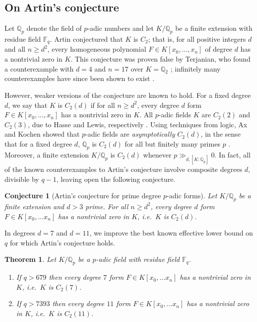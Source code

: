\documentclass{amsart}
\newcommand{\Q}{\mathbb{Q}}
\newcommand{\F}{\mathbb{F}}
\newtheorem{theoremAlph}{Theorem}
\newtheorem*{conjecture*}{Conjecture}
\theoremstyle{definition}
\numberwithin{equation}{section}
\numberwithin{table}{section}
\newcommand{\qbound}[1]{{\color{cyan}$q > {#1}$}}
\renewcommand{\qbound}[1]{{$q > {#1}$}}
\begin{document}
\subsection{On Artin's conjecture}

Let $\mathbb{Q}_p$ denote the field of $p$-adic numbers and let $K/\mathbb{Q}_p$ be a finite extension with residue field $\mathbb{F}_q$. Artin conjectured that $K$ is $C_2$; that is, for all positive integers $d$ and all $n \geq d^2$, every homogeneous polynomial $F \in K[x_0, \ldots, x_n]$ of degree $d$ has a nontrivial zero in $K$. This conjecture was proven false by Terjanian, who found a counterexample with $d=4$ and $n=17$ over $K = \mathbb{Q}_2$ \cite{Terjanian1966}; infinitely many counterexamples have since been shown to exist \cite{LewisMontgomery}.

However, weaker versions of the conjecture are known to hold. For a fixed degree $d$, we say that $K$ is $C_2(d)$ if for all $n \geq d^2$, every degree $d$ form $F \in K[x_0, \ldots, x_n]$ has a nontrivial zero in $K$. All $p$-adic fields $K$ are $C_2(2)$ and $C_2(3)$, due to Hasse and Lewis, respectively \cite{Lewis1952}. Using techniques from logic, Ax and Kochen showed that $p$-adic fields are \textit{asymptotically} $C_2(d)$, in the sense that for a fixed degree $d$, $\Q_p$ is $C_2(d)$ for all but finitely many primes $p$ \cite{AxKochen1965}. Moreover, a finite extension $K/\Q_p$ is $C_2(d)$ whenever $p \gg_{d, [K:\Q_p]} 0$. In fact, all of the known counterexamples to Artin's conjecture involve composite degrees $d$, divisible by $q-1$, leaving open the following conjecture.

\begin{conjecture*}[Artin's conjecture for prime degree $p$-adic forms]
\label{conj:artin}
    Let $K/\mathbb{Q}_p$ be a finite extension and $d > 3$ prime. For all $n \geq d^2$, every degree $d$ form $F \in K[x_0, \ldots x_n]$ has a nontrivial zero in $K$, i.e.\ $K$ is $C_2(d)$.
\end{conjecture*}

In degrees $d=7$ and $d=11$, we improve the best known effective lower bound on $q$ for which Artin's conjecture holds.

\begin{theoremAlph}\label{thm:deg711}
    Let $K/\Q_p$ be a $p$-adic field with residue field $\F_q$. 
    \begin{enumerate}[label = (\roman*)]
        \item If \qbound{679} then every degree $7$ form $F \in K[x_0, \ldots x_n]$ has a nontrivial zero in $K$, i.e.\ $K$ is $C_2(7)$.
        \item If \qbound{7393} then every degree $11$ form $F \in K[x_0, \ldots x_n]$ has a nontrivial zero in $K$, i.e.\ $K$ is $C_2(11)$.
    \end{enumerate}
\end{theoremAlph}
\end{document}
